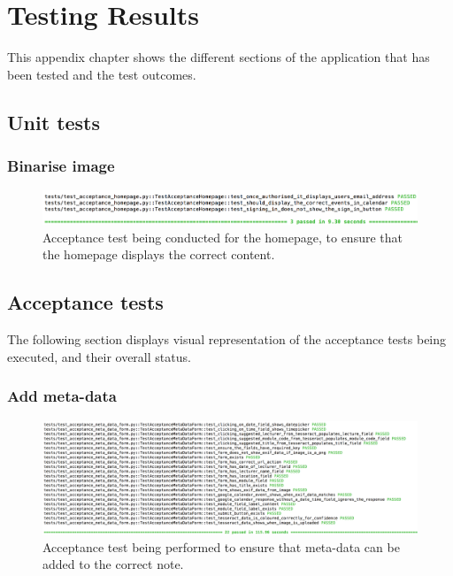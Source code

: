 \chapter{Testing Results}

\label{appendix:test_results}
This appendix chapter shows the different sections of the application that has been tested and the test outcomes.


\section{Unit tests} \label{test:unit}
\subsection{Binarise image}
\begin{figure}[H]
  \centering
  \includegraphics[width=\textwidth]{images/test_acceptance_homepage}
  \caption{Acceptance test being conducted for the homepage, to ensure that the homepage displays the correct content.}
  \label{fig:acceptance_homepage}
\end{figure}

\section{Acceptance tests} \label{tests:acceptance}
\label{appendix:acceptance}
The following section displays visual representation of the acceptance tests being executed, and their overall status.

\subsection{Add meta-data}

\begin{figure}[H]
  \centering
  \includegraphics[width=\textwidth]{images/test_acceptance_meta_data_form}
  \caption{Acceptance test being performed to ensure that meta-data can be added to the correct note.}
  \label{fig:acceptance_add_meta_data}
\end{figure}

